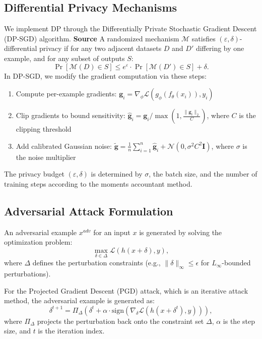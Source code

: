 \documentclass[11pt, conference]{IEEEtran}
\begin{document}
\subsection{Differential Privacy Mechanisms}
We implement DP through the Differentially Private Stochastic Gradient Descent (DP-SGD) algorithm.
\textbf{Source} A randomized mechanism $\mathcal{M}$ satisfies $(\varepsilon, \delta)$-differential privacy if for any two adjacent datasets $D$ and $D'$ differing by one example, and for any subset of outputs $S$:
\begin{equation}
\Pr[\mathcal{M}(D) \in S] \leq e^{\varepsilon} \cdot \Pr[\mathcal{M}(D') \in S] + \delta.
\end{equation}
In DP-SGD, we modify the gradient computation via these steps:
\begin{enumerate}
    \item Compute per-example gradients: $\mathbf{g}_i = \nabla_{\phi} \mathcal{L}(g_{\phi}(f_{\theta}(x_i)), y_i)$
    
    \item Clip gradients to bound sensitivity: $\hat{\mathbf{g}}_i = \mathbf{g}_i / \max(1, \frac{\|\mathbf{g}_i\|_2}{C})$, where $C$ is the clipping threshold
    
    \item Add calibrated Gaussian noise: $\tilde{\mathbf{g}} = \frac{1}{n} \sum_{i=1}^{n} \hat{\mathbf{g}}_i + \mathcal{N}(0, \sigma^2 C^2 \mathbf{I})$, where $\sigma$ is the noise multiplier
\end{enumerate}

The privacy budget $(\varepsilon, \delta)$ is determined by $\sigma$, the batch size, and the number of training steps according to the moments accountant method.

\subsection{Adversarial Attack Formulation}
An adversarial example $x^{adv}$ for an input $x$ is generated by solving the optimization problem:
\begin{equation}
\label{Adversarial Optimization}
\max_{\delta \in \Delta} \mathcal{L}(h(x + \delta), y),
\end{equation}
where $\Delta$ defines the perturbation constraints (e.g., $\|\delta\|_{\infty} \leq \epsilon$ for $L_{\infty}$-bounded perturbations).

For the Projected Gradient Descent (PGD) attack, which is an iterative attack method, the adversarial example is generated as:
\begin{equation}
\label{PGD}
\delta^{t+1} = \Pi_{\Delta}(\delta^t + \alpha \cdot \text{sign}(\nabla_{\delta} \mathcal{L}(h(x + \delta^t), y))),
\end{equation}
where $\Pi_{\Delta}$ projects the perturbation back onto the constraint set $\Delta$, $\alpha$ is the step size, and $t$ is the iteration index.
\end{document}
